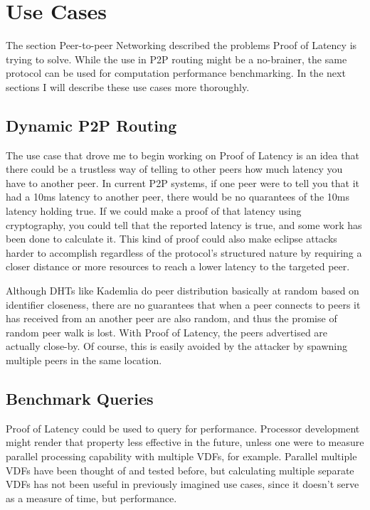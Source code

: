 \section{Use Cases}
The section Peer-to-peer Networking described the problems Proof of Latency is trying to solve. While the use in P2P routing might be a no-brainer, the same protocol can be used for computation performance benchmarking. In the next sections I will describe these use cases more thoroughly.

\subsection{Dynamic P2P Routing}
The use case that drove me to begin working on Proof of Latency is an idea that there could be a trustless way of telling to other peers how much latency you have to another peer. In current P2P systems, if one peer were to tell you that it had a 10ms latency to another peer, there would be no quarantees of the 10ms latency holding true. If we could make a proof of that latency using cryptography, you could tell that the reported latency is true, and some work has been done to calculate it. This kind of proof could also make eclipse attacks harder to accomplish regardless of the protocol's structured nature by requiring a closer distance or more resources to reach a lower latency to the targeted peer.


Although DHTs like Kademlia do peer distribution basically at random based on identifier closeness, there are no guarantees that when a peer connects to peers it has received from an another peer are also random, and thus the promise of random peer walk is lost. With Proof of Latency, the peers advertised are actually close-by. Of course, this is easily avoided by the attacker by spawning multiple peers in the same location.

\subsection{Benchmark Queries}
Proof of Latency could be used to query for performance. Processor development might render that property less effective in the future, unless one were to measure parallel processing capability with multiple VDFs, for example. Parallel multiple VDFs have been thought of and tested before, but calculating multiple separate VDFs has not been useful in previously imagined use cases, since it doesn't serve as a measure of time, but performance.

